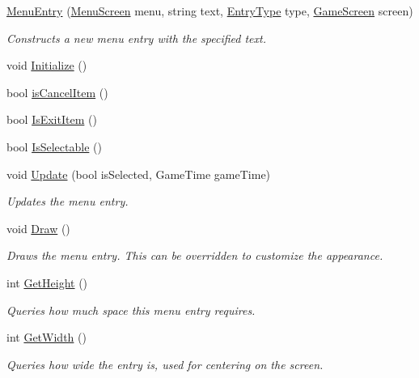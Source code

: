 \begin{DoxyCompactItemize}
\item 
\hyperlink{classgearit_1_1xna_1_1_menu_entry_a40e2d2dace3740ba578131a4180bd92e}{Menu\+Entry} (\hyperlink{classgearit_1_1xna_1_1_menu_screen}{Menu\+Screen} menu, string text, \hyperlink{namespacegearit_1_1xna_abf541ce7c750f327a7606b3c4fbce023}{Entry\+Type} type, \hyperlink{classgearit_1_1xna_1_1_game_screen}{Game\+Screen} screen)
\begin{DoxyCompactList}\small\item\em Constructs a new menu entry with the specified text. \end{DoxyCompactList}\item 
void \hyperlink{classgearit_1_1xna_1_1_menu_entry_a6086e708e7f61a9eff6668bd0b447848}{Initialize} ()
\item 
bool \hyperlink{classgearit_1_1xna_1_1_menu_entry_a56b8d46bfc976955d2096ac07a21e9d9}{is\+Cancel\+Item} ()
\item 
bool \hyperlink{classgearit_1_1xna_1_1_menu_entry_a70cbdda44b14de2642095f5cf13d99db}{Is\+Exit\+Item} ()
\item 
bool \hyperlink{classgearit_1_1xna_1_1_menu_entry_abf04b41d1bd19d63c0600d8918ec8f97}{Is\+Selectable} ()
\item 
void \hyperlink{classgearit_1_1xna_1_1_menu_entry_aa68874f80c8ead99a3ac265724be7796}{Update} (bool is\+Selected, Game\+Time game\+Time)
\begin{DoxyCompactList}\small\item\em Updates the menu entry. \end{DoxyCompactList}\item 
void \hyperlink{classgearit_1_1xna_1_1_menu_entry_acbeac93d88cbbfc432a13ddf2df75cb2}{Draw} ()
\begin{DoxyCompactList}\small\item\em Draws the menu entry. This can be overridden to customize the appearance. \end{DoxyCompactList}\item 
int \hyperlink{classgearit_1_1xna_1_1_menu_entry_a9a5ef264087c9129167f26db314b5d90}{Get\+Height} ()
\begin{DoxyCompactList}\small\item\em Queries how much space this menu entry requires. \end{DoxyCompactList}\item 
int \hyperlink{classgearit_1_1xna_1_1_menu_entry_a918a4f3de7cf3d489058753a5eb8ceeb}{Get\+Width} ()
\begin{DoxyCompactList}\small\item\em Queries how wide the entry is, used for centering on the screen. \end{DoxyCompactList}\end{DoxyCompactItemize}
